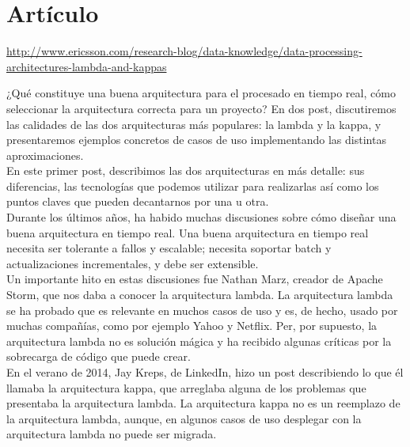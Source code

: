 \documentclass[12pt,a4paper,twoside,openright,titlepage,final]{article}
\author{José Ignacio Escribano}
\title{}
\begin{document}
\setcounter{page}{1}


\tableofcontents
\thispagestyle{empty}
\newpage

\setcounter{page}{1}

\section{Artículo}
\url{http://www.ericsson.com/research-blog/data-knowledge/data-processing-architectures-lambda-and-kappas}

¿Qué constituye una buena arquitectura para el procesado en tiempo real, cómo seleccionar la arquitectura correcta para un proyecto? En dos post, discutiremos las calidades de las dos arquitecturas más populares: la lambda y la kappa, y presentaremos ejemplos concretos de casos de uso implementando las distintas aproximaciones.\\

En este primer post, describimos las dos arquitecturas en más detalle: sus diferencias, las tecnologías que podemos utilizar para realizarlas así como los puntos claves que pueden decantarnos por una u otra.\\

Durante los últimos años, ha habido muchas discusiones sobre cómo diseñar una buena arquitectura en tiempo real. Una buena arquitectura en tiempo real necesita ser tolerante a fallos y escalable; necesita soportar batch y actualizaciones incrementales, y debe ser extensible.\\

Un importante hito en estas discusiones fue Nathan Marz, creador de Apache Storm, que nos daba a conocer la arquitectura lambda. La arquitectura lambda se ha probado que es relevante en muchos casos de uso y es, de hecho, usado por muchas compañías, como por ejemplo Yahoo y Netflix. Per, por supuesto, la arquitectura lambda no es solución mágica y ha recibido algunas críticas por la sobrecarga de código que puede crear.\\

En el verano de 2014, Jay Kreps, de LinkedIn, hizo un post describiendo lo que él llamaba la arquitectura kappa, que arreglaba alguna de los problemas que presentaba la arquitectura lambda. La arquitectura kappa no es un reemplazo de la arquitectura lambda, aunque, en algunos casos de uso desplegar con la arquitectura lambda no puede ser migrada.\\
\end{document}
